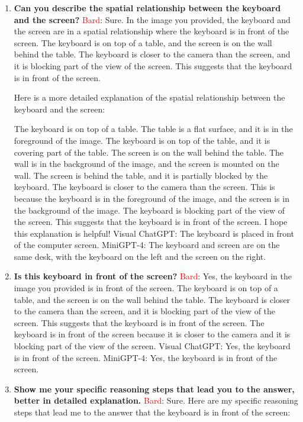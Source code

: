 \begin{enumerate}
    \item \textbf{Can you describe the spatial relationship between the keyboard and the screen?}
    \subitem \textcolor{Red}{Bard}: Sure. In the image you provided, the keyboard and the screen are in a spatial relationship where the keyboard is in front of the screen. The keyboard is on top of a table, and the screen is on the wall behind the table. The keyboard is closer to the camera than the screen, and it is blocking part of the view of the screen. This suggests that the keyboard is in front of the screen.

    Here is a more detailed explanation of the spatial relationship between the keyboard and the screen:
    
    The keyboard is on top of a table. The table is a flat surface, and it is in the foreground of the image. The keyboard is on top of the table, and it is covering part of the table.
    The screen is on the wall behind the table. The wall is in the background of the image, and the screen is mounted on the wall. The screen is behind the table, and it is partially blocked by the keyboard.
    The keyboard is closer to the camera than the screen. This is because the keyboard is in the foreground of the image, and the screen is in the background of the image.
    The keyboard is blocking part of the view of the screen. This suggests that the keyboard is in front of the screen.
    I hope this explanation is helpful!
    \subitem Visual ChatGPT: The keyboard is placed in front of the computer screen.
    \subitem MiniGPT-4: The keyboard and screen are on the same desk, with the keyboard on the left and the screen on the right.
    \item \textbf{Is this keyboard in front of the screen?}
    \subitem \textcolor{Red}{Bard}: Yes, the keyboard in the image you provided is in front of the screen. The keyboard is on top of a table, and the screen is on the wall behind the table. The keyboard is closer to the camera than the screen, and it is blocking part of the view of the screen. This suggests that the keyboard is in front of the screen. The keyboard is in front of the screen because it is closer to the camera and it is blocking part of the view of the screen.
    \subitem Visual ChatGPT: Yes, the keyboard is in front of the screen.
    \subitem MiniGPT-4: Yes, the keyboard is in front of the screen.
    \item \textbf{Show me your specific reasoning steps that lead you to the answer, better in detailed explanation.}
    \subitem \textcolor{Red}{Bard}: 
    Sure. Here are my specific reasoning steps that lead me to the answer that the keyboard is in front of the screen:
    

\end{enumerate}
